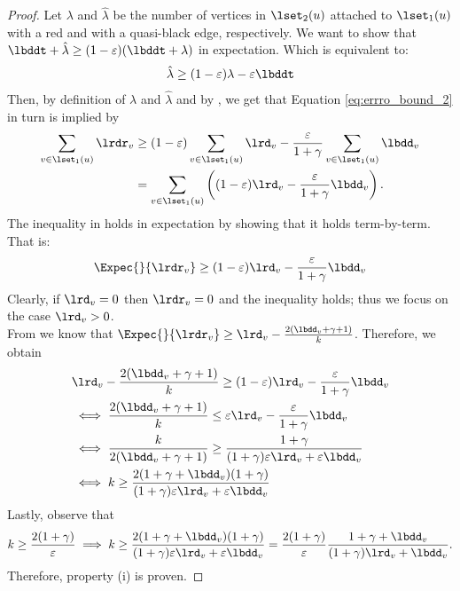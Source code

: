 \begin{proof}
Let $\lambda$ and $\hat{\lambda}$ be the number of vertices in $\lset_2(u)$ attached to $\lset_1(u)$ with a red and with a quasi-black edge, respectively. We want to show that $\lbddt+ \hat{\lambda} \geq (1-\varepsilon)(\lbddt+ \lambda)$ in expectation. Which is equivalent to:
    \begin{align} \label{eq:errro_bound_2}
    \hat{\lambda} \ge (1-\varepsilon)\lambda - \varepsilon \lbddt   
    \end{align}
    Then, by definition of $\lambda$ and $\hat{\lambda}$ and by , we get that Equation \ref{eq:errro_bound_2} in turn is implied by 
    \begin{align} \label{eq:error_bound_3}
    \sum_{v \in \lset_1(u)}{\lrdr_v} &\ge (1-\varepsilon)\sum_{v \in \lset_1(u)}{\lrd_v} - \frac{\varepsilon}{1 + \gamma}\sum_{v \in \lset_1(u)}{\lbdd_v}\\
    &= \sum_{v \in \lset_1(u)}{\left((1-\varepsilon)\lrd_v - \frac{\varepsilon}{1 + \gamma}\lbdd_v \right).} \notag
    \end{align}
    The inequality in  holds in expectation by showing that it holds term-by-term. That is:
    \begin{equation*}
        \Expec{}{\lrdr_v} \ge (1-\varepsilon)\lrd_v - \frac{\varepsilon}{1+\gamma}\lbdd_v
    \end{equation*}
    Clearly, if $\lrd_v = 0$ then $\lrdr_v = 0$ and the inequality holds; thus we focus on the case $\lrd_v > 0$.\\ From  we know that $\Expec{}{\lrdr_v} \geq \lrd_v - \frac{2(\lbdd_v + \gamma + 1)}{k}$. Therefore, we obtain
    \begin{align*}
        &\lrd_v - \frac{2(\lbdd_v + \gamma + 1)}{k} \ge (1-\varepsilon)\lrd_v - \frac{\varepsilon}{1+\gamma}\lbdd_v\\
        &\iff \frac{2(\lbdd_v + \gamma + 1)}{k} \leq \varepsilon \lrd_v - \frac{\varepsilon}{1 + \gamma}\lbdd_v \\
        &\iff \frac{k}{2(\lbdd_v + \gamma + 1)} \geq \frac{1+\gamma}{(1+\gamma)\varepsilon \lrd_v + \varepsilon \lbdd_v} \\
        &\iff k \geq \frac{2(1+\gamma + \lbdd_v)(1 + \gamma)}{(1 + \gamma)\varepsilon \lrd_v +\varepsilon \lbdd_v}
    \end{align*}
    Lastly, observe that
    \begin{align*}
    k \ge \frac{2(1+\gamma)}{\varepsilon} \implies k \ge \frac{2(1+\gamma + \lbdd_v)(1 + \gamma)}{(1 + \gamma)\varepsilon \lrd_v + \varepsilon \lbdd_v} =  \frac{2(1+\gamma)}{\varepsilon} \frac{1 + \gamma + \lbdd_v}{(1+\gamma)\lrd_v + \lbdd_v}.    
    \end{align*}
    Therefore, property (i) is proven.


\end{proof}
